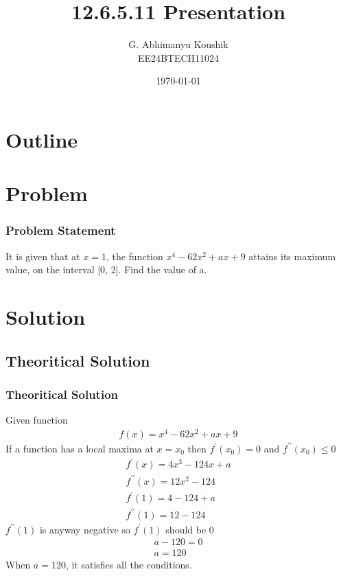 \documentclass{beamer}
\title{12.6.5.11 Presentation}
\author{G. Abhimanyu Koushik \\ EE24BTECH11024}
\date{\today}
\providecommand{\brak}[1]{\ensuremath{\left(#1\right)}}
\theoremstyle{remark}
\numberwithin{equation}{section}
\begin{document}
\begin{frame}
\titlepage
\end{frame}

\section*{Outline}
\begin{frame}
\tableofcontents
\end{frame}
\section{Problem}
\begin{frame}
\frametitle{Problem Statement}
%
It is given that at $x = 1$, the function $x^4 - 62x^2 + ax + 9$ attains its maximum value, on the interval [0, 2]. Find the value of a.
%
\end{frame}

\section{Solution}
\subsection{Theoritical Solution}
\begin{frame}
\frametitle{Theoritical Solution}
Given function
\begin{align}
	f\brak{x} = x^4 - 62x^2 + ax + 9
\end{align}
If a function has a local maxima at $x=x_0$ then $f^\prime\brak{x_0} = 0$ and $f^{\prime\prime}\brak{x_0} \le 0$
\begin{align}
	f^\prime\brak{x} = 4x^3 - 124x + a \\
	f^{\prime\prime}\brak{x} = 12x^2 - 124\\
	f^\prime\brak{1} = 4-124+a\\
	f^{\prime\prime}\brak{1} = 12 - 124
\end{align}
$f^{\prime\prime}\brak{1}$ is anyway negative so $f^\prime\brak{1}$ should be $0$
\begin{align}
	a-120 =0\\
	a = 120
\end{align}
When $a = 120$, it satisfies all the conditions.\\
\end{frame}
\end{document}
